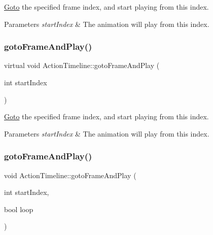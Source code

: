 \hyperlink{classGoto}{Goto} the specified frame index, and start playing from this index. 
\begin{DoxyParams}{Parameters}
{\em start\+Index} & The animation will play from this index. \\
\hline
\end{DoxyParams}
\mbox{\label{classActionTimeline_a4c39309a984768663040e516163674f7}} 
\subsubsection{\texorpdfstring{goto\+Frame\+And\+Play()}{gotoFrameAndPlay()}\hspace{0.1cm}{\footnotesize\ttfamily [2/8]}}
{\footnotesize\ttfamily virtual void Action\+Timeline\+::goto\+Frame\+And\+Play (\begin{DoxyParamCaption}\item[{int}]{start\+Index }\end{DoxyParamCaption})\hspace{0.3cm}{\ttfamily [virtual]}}

\hyperlink{classGoto}{Goto} the specified frame index, and start playing from this index. 
\begin{DoxyParams}{Parameters}
{\em start\+Index} & The animation will play from this index. \\
\hline
\end{DoxyParams}
\mbox{\label{classActionTimeline_ac480c1d28f280c0d0cdc3f02fb49bd24}} 
\subsubsection{\texorpdfstring{goto\+Frame\+And\+Play()}{gotoFrameAndPlay()}\hspace{0.1cm}{\footnotesize\ttfamily [3/8]}}
{\footnotesize\ttfamily void Action\+Timeline\+::goto\+Frame\+And\+Play (\begin{DoxyParamCaption}\item[{int}]{start\+Index,  }\item[{bool}]{loop }\end{DoxyParamCaption})\hspace{0.3cm}{\ttfamily [virtual]}}

